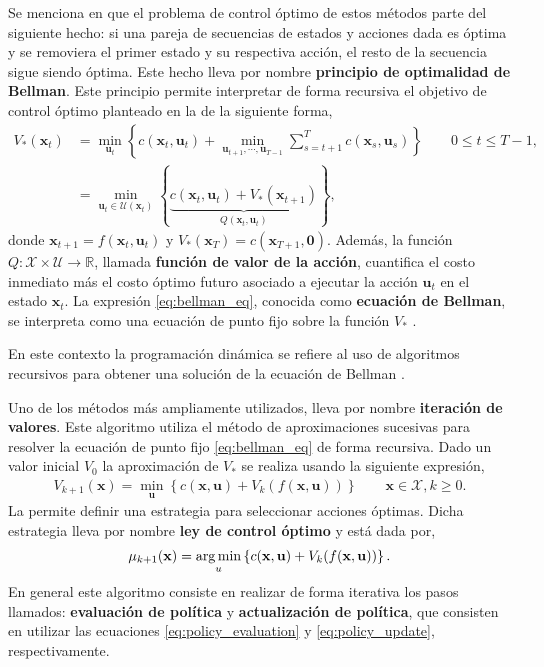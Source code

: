 Se menciona en \cite{meyn2022} que el problema de control óptimo de estos métodos parte del siguiente hecho: si una pareja de secuencias de estados y acciones dada es óptima y se removiera el primer estado y su respectiva acción, el resto de la secuencia sigue siendo óptima. Este hecho lleva por nombre \textbf{principio de optimalidad de Bellman}.  
Este principio permite interpretar de forma recursiva el objetivo de control óptimo planteado en la  de la siguiente forma,
\begin{equation}
\begin{aligned}
    V_{*}(\mathbf{x}_t) &= 
\min_{\mathbf{u}_t}\left\{ c(\mathbf{x}_t, \mathbf{u}_t) + \min_{\mathbf{u}_{t+1},\cdots, \mathbf{u}_{T-1}}
\sum_{s=t+1}^{T}c(\mathbf{x}_s, \mathbf{u}_s)\right\} \qquad 0 \leq t \leq T-1, \\
&=
\min_{\mathbf{u}_t\in \mathcal{U}(\mathbf{x}_t)} \left\{\underbrace{c(\mathbf{x}_t, \mathbf{u}_t) + V_{*}(\mathbf{x}_{t+1})}_{Q(\mathbf{x}_t, \mathbf{u}_t)}\right\},
\end{aligned}
\label{eq:bellman_eq}     
\end{equation}
donde $\mathbf{x}_{t+1} = f(\mathbf{x}_t, \mathbf{u}_t)$ y $V_{*}(\mathbf{x}_{T})=c(\mathbf{x}_{T+1}, \bm{0})$. Además, la función $Q:\mathcal{X}\times\mathcal{U}\rightarrow\mathbb{R}$, llamada \textbf{función de valor de la acción}, cuantifica el costo inmediato más el costo óptimo futuro asociado a ejecutar la acción $\mathbf{u}_t$ en el estado $\mathbf{x}_t$. La expresión \ref{eq:bellman_eq}, conocida como \textbf{ecuación de Bellman}, se interpreta como una ecuación de punto fijo sobre la función $V_{*}$ \cite{meyn2022}. 

En este contexto la programación dinámica se refiere al uso de algoritmos recursivos para obtener una solución de la ecuación de Bellman \cite{meyn2022}.  

Uno de los métodos más ampliamente utilizados, lleva por nombre \textbf{iteración de valores}. Este algoritmo utiliza el método de aproximaciones sucesivas para resolver la ecuación de punto fijo \ref{eq:bellman_eq} de forma recursiva. Dado un valor inicial $V_0$ la aproximación de $V_{*}$ se realiza usando la siguiente expresión,
\begin{align}
    V_{k+1}(\mathbf{x}) = \min_{\mathbf{u}}\left\{
    c(\mathbf{x}, \mathbf{u})+ V_{k}(f(\mathbf{x}, \mathbf{u}))\right\}\qquad \mathbf{x}\in \mathcal{X}, k\geq 0.
    \label{eq:policy_evaluation}
\end{align}
La  permite definir una estrategia para seleccionar acciones óptimas. Dicha estrategia lleva por nombre \textbf{ley de control óptimo} y está dada por,
\begin{align}
    \mu_{k+1}(\mathbf{x}) = \operatorname*{arg\,min}_{u}\left\{
        c(\mathbf{x}, \mathbf{u})+ V_{k}(f(\mathbf{x}, \mathbf{u}))
        \label{eq:policy_update} 
    \right\}.
\end{align}
En general este algoritmo consiste en realizar de forma iterativa los pasos llamados: \textbf{evaluación de política} y \textbf{actualización de política}, que consisten en utilizar las ecuaciones \ref{eq:policy_evaluation} y \ref{eq:policy_update}, respectivamente. 

